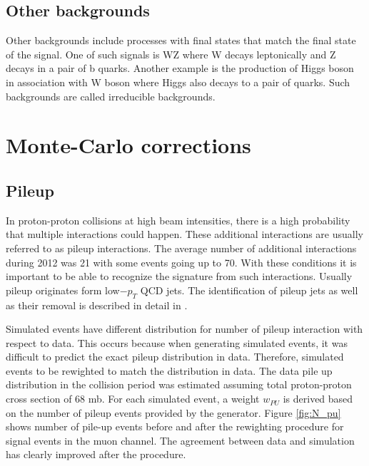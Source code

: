 \subsection{Other backgrounds}
Other backgrounds include processes with final states that match the final state of the signal. One of such signals is WZ where W decays leptonically and Z decays in a pair of b quarks. Another example is the production of Higgs boson in association with W boson where Higgs also decays to a pair of  quarks. Such backgrounds are called irreducible backgrounds.


\section{Monte-Carlo corrections}
\label{sec:mcSF}

\subsection{Pileup}

In proton-proton collisions at high beam intensities, there is a high probability that multiple interactions could happen. These additional interactions are usually referred to as pileup interactions. The average number of additional interactions during 2012 was 21 with some events going up to 70. With these conditions it is important to be able to recognize the signature from such interactions. Usually pileup originates form low$-p_T$ QCD jets. The identification of pileup jets as well as their removal is described in detail in \cite{CMS:2013wea}. 
\par Simulated events have different distribution for number of pileup interaction with respect to data. This occurs because when generating simulated events, it was difficult to predict the exact pileup distribution in data. Therefore, simulated events to be rewighted to match the distribution in data. The data pile up distribution in the collision period was estimated assuming total proton-proton cross section of 68 mb. For each simulated event, a weight $w_{PU}$ is derived based on the number of pileup events provided by the generator. Figure \ref{fig:N_pu} shows number of pile-up events before and after the rewighting procedure for signal events in the muon channel. The agreement between data and simulation has clearly improved after the procedure. 

